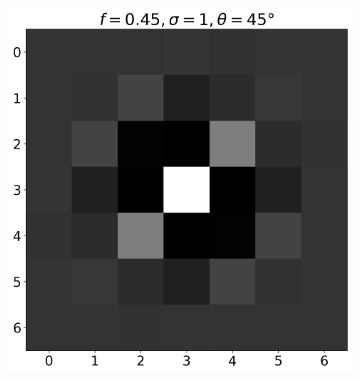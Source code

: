 \documentclass[12pt,a4paper, english]{article}
\begin{document}
\begin{figure}[!htbp]
\begin{subfigure}[b]{0.3\textwidth}
      \end{subfigure}
      \begin{subfigure}[b]{0.3\textwidth}
        \includegraphics[width=\textwidth]{img/K5.png}
      \end{subfigure}


\end{figure}
\end{document}
